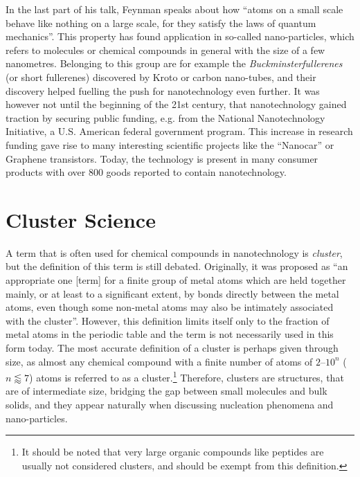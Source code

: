In the last part of his talk, Feynman speaks about how ``atoms on a small scale
behave like nothing on a large scale, for they satisfy the laws of quantum
mechanics''. This property has found application in so-called nano-particles,
which refers to molecules or chemical compounds in general with the size of a
few nanometres. Belonging to this group are for example the
\emph{Buckminsterfullerenes} (or short fullerenes) discovered by
Kroto\autocite{Kroto_C60Buckminsterfullerene_1985} or carbon
nano-tubes\autocite{Iijima_Helicalmicrotubulesgraphitic_1991}, and their
discovery helped fuelling the push for nanotechnology even further. It was
however not until the beginning of the 21st century, that nanotechnology gained
traction by securing public funding, e.g. from the National Nanotechnology
Initiative, a U.S. American federal government program. This increase in
research funding gave rise to many interesting scientific projects like the
``Nanocar''\autocite{Kudernac_Electricallydrivendirectional_2011} or Graphene
transistors.\autocite{Wu_Highfrequencyscaledgraphene_2011} Today, the technology
is present in many consumer products with over 800 goods reported to contain
nanotechnology.\autocite{Vance_Nanotechnologyrealworld_2015}

\section{Cluster Science}
\label{sec:ClusterScience}

A term that is often used for chemical compounds in nanotechnology is
\emph{cluster}, but the definition of this term is still debated. Originally,
it was proposed as ``an appropriate one [term] for a finite group of metal
atoms which are held together mainly, or at least to a significant extent, by
bonds directly between the metal atoms, even though some non-metal atoms may
also be intimately associated with the
cluster''.\autocite{Cotton_MetalAtomClusters_1964} However, this definition
limits itself only to the fraction of metal atoms in the periodic table and the
term is not necessarily used in this form today. The most accurate definition
of a cluster is perhaps given through size, as almost any chemical compound
with a finite number of atoms of $2$--$10^n$ ($n\lessapprox 7$) atoms is
referred to as a cluster.\footnote{It should be noted that very large organic
compounds like peptides are usually not considered clusters, and should be
exempt from this
definition.}\autocite{Johnston_Atomicmolecularclusters_2002,Wales_Energylandscapes_2003}
Therefore, clusters are structures, that are of intermediate size, bridging the
gap between small molecules and bulk solids, and they appear naturally when
discussing nucleation phenomena and nano-particles. 

